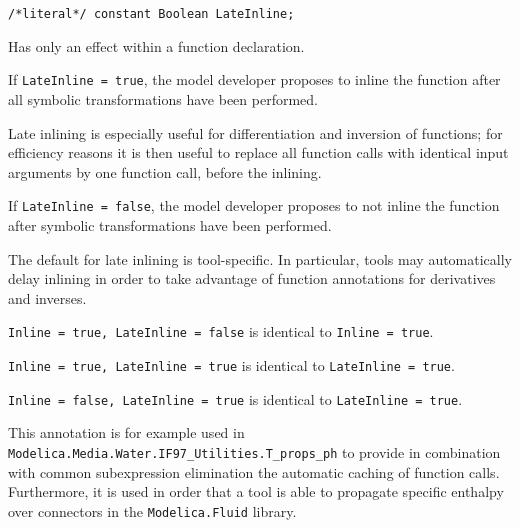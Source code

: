 \begin{annotationdefinition}[LateInline]
\begin{synopsis}\begin{lstlisting}
/*literal*/ constant Boolean LateInline;
\end{lstlisting}\end{synopsis}
\begin{semantics}
Has only an effect within a function declaration.

If {\lstinline!LateInline = true!}, the model developer proposes to inline the function after all symbolic transformations have been performed.

\begin{nonnormative}
Late inlining is especially useful for differentiation and inversion of functions; for efficiency reasons it is then useful to replace all function calls with identical input arguments by one function call, before the inlining.
\end{nonnormative}

If {\lstinline!LateInline = false!}, the model developer proposes to not inline the function after symbolic transformations have been performed.

The default for late inlining is tool-specific.
In particular, tools may automatically delay inlining in order to take advantage of function annotations for derivatives and inverses.

{\lstinline!Inline = true, LateInline = false!} is identical to {\lstinline!Inline = true!}.

{\lstinline!Inline = true, LateInline = true!} is identical to {\lstinline!LateInline = true!}.

{\lstinline!Inline = false, LateInline = true!} is identical to {\lstinline!LateInline = true!}.

\begin{nonnormative}
This annotation is for example used in {\lstinline!Modelica.Media.Water.IF97_Utilities.T_props_ph!} to provide in combination with common subexpression elimination the automatic caching of function calls.
Furthermore, it is used in order that a tool is able to propagate specific enthalpy over connectors in the {\lstinline!Modelica.Fluid!} library.
\end{nonnormative}
\end{semantics}
\end{annotationdefinition}


